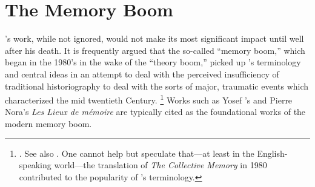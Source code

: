 
\section{The Memory Boom}

\halbwachs's work, while not ignored, would not make its most significant impact until well after his death. It is frequently argued that the so-called ``memory boom,'' which began in the 1980's in the wake of the ``theory boom,'' picked up \halbwachs's terminology and central ideas in an attempt to deal with the perceived insufficiency of traditional historiography to deal with the sorts of major, traumatic events which characterized the mid twentieth Century.%
%
\footnote{\Cite[1--2]{galinsky_galinsky2016}. See also \cite[29--36]{olick_olick-etal2011}. One cannot help but speculate that---at least in the English-speaking world---the translation of \emph{The Collective Memory} in 1980 contributed to the popularity of \halbwachs's terminology.}
%
Works such as Yosef \yerushalmi's  and Pierre Nora's \emph{Les Lieux de mémoire} are typically cited as the foundational works of the modern memory boom.\autocites[112--113]{klein2011}{yerushalmi1989}[Nora's massive project has been abridged and translated into English as][]{nora1996}  

